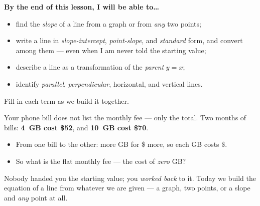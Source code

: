 \documentclass[10pt]{article}
\begin{document}

\vspace{0.10in}

\begin{objectivebox}
\textbf{By the end of this lesson, I will be able to\dots}
\begin{itemize}\setlength{\itemsep}{2pt}
  \item find the \emph{slope} of a line from a graph or from \emph{any} two points;
  \item write a line in \emph{slope-intercept}, \emph{point-slope}, and \emph{standard} form, and
        convert among them --- even when I am never told the starting value;
  \item describe a line as a transformation of the \emph{parent} $y=x$;
  \item identify \emph{parallel}, \emph{perpendicular}, horizontal, and vertical lines.
\end{itemize}
\end{objectivebox}

\vspace{0.05in}

\begin{vocabbox}
\small
Fill in each term as we build it together.
\par\vspace{2pt}   %
\end{vocabbox}

\begin{hookbox}
Your phone bill does not list the monthly fee --- only the total. Two months of bills:
\textbf{4~GB cost \$52}, and \textbf{10~GB cost \$70}.
\begin{itemize}\setlength{\itemsep}{1pt}
  \item From one bill to the other: \blank{1.2cm} more GB for \$\blank{1.2cm} more, so each
        GB costs \$\blank{1.0cm}.
  \item So what is the flat monthly fee --- the cost of \emph{zero} GB? \blank{1.4cm}
\end{itemize}
Nobody handed you the starting value; you \emph{worked back} to it. Today we build the equation of a
line from whatever we are given --- a graph, two points, or a slope and \emph{any} point at all.
\end{hookbox}
\end{document}
